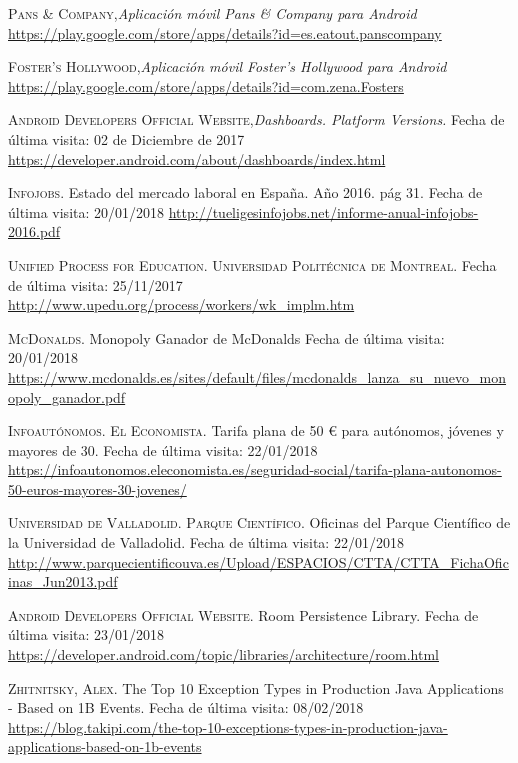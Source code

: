 \documentclass[twoside]{report}
\begin{document}
\begin{thebibliography}{a}
 \textsc{Pans \& Company},\textit{Aplicación móvil Pans \& Company para Android} \url{https://play.google.com/store/apps/details?id=es.eatout.panscompany}

 \textsc{Foster's Hollywood},\textit{Aplicación móvil Foster's Hollywood para Android} \url{https://play.google.com/store/apps/details?id=com.zena.Fosters}

 \textsc{Android Developers Official Website},\textit{Dashboards. Platform Versions.} Fecha de última visita: 02 de Diciembre de 2017 \url{https://developer.android.com/about/dashboards/index.html}

 \textsc{Infojobs}. Estado del mercado laboral en España. Año 2016. pág 31. Fecha de última visita: 20/01/2018 \url{http://tueligesinfojobs.net/informe-anual-infojobs-2016.pdf} 

 \textsc{Unified Process for Education. Universidad Politécnica de Montreal}. Fecha de última visita: 25/11/2017 \url{http://www.upedu.org/process/workers/wk_implm.htm}

 \textsc{McDonalds}. Monopoly Ganador de McDonalds Fecha de última visita: 20/01/2018 \url{https://www.mcdonalds.es/sites/default/files/mcdonalds_lanza_su_nuevo_monopoly_ganador.pdf}

 \textsc{Infoautónomos. El Economista}. Tarifa plana de 50 \euro \hspace{0.1cm} para autónomos, jóvenes y mayores de 30. Fecha de última visita: 22/01/2018 \url{https://infoautonomos.eleconomista.es/seguridad-social/tarifa-plana-autonomos-50-euros-mayores-30-jovenes/}

 \textsc{Universidad de Valladolid. Parque Científico}. Oficinas del Parque Científico de la Universidad de Valladolid. Fecha de última visita: 22/01/2018 \url{http://www.parquecientificouva.es/Upload/ESPACIOS/CTTA/CTTA_FichaOficinas_Jun2013.pdf}

 \textsc{Android Developers Official Website}. Room Persistence Library. Fecha de última visita: 23/01/2018 \url{https://developer.android.com/topic/libraries/architecture/room.html}

 \textsc{Zhitnitsky, Alex}. The Top 10 Exception Types in Production Java Applications - Based on 1B Events. Fecha de última visita: 08/02/2018 \url{https://blog.takipi.com/the-top-10-exceptions-types-in-production-java-applications-based-on-1b-events}


\end{thebibliography}
\end{document}
